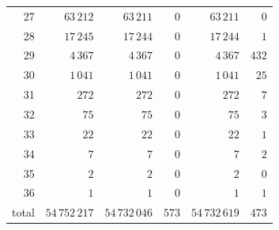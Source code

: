 \begin{tabular}{rrrrrr}
27 & $63\,212$ & $63\,211$ & $0$ & $63\,211$ & $0$\\
28 & $17\,245$ & $17\,244$ & $0$ & $17\,244$ & $1$\\
29 & $4\,367$ & $4\,367$ & $0$ & $4\,367$ & $432$\\
30 & $1\,041$ & $1\,041$ & $0$ & $1\,041$ & $25$\\
31 & $272$ & $272$ & $0$ & $272$ & $7$\\
32 & $75$ & $75$ & $0$ & $75$ & $3$\\
33 & $22$ & $22$ & $0$ & $22$ & $1$\\
34 & $7$ & $7$ & $0$ & $7$ & $2$\\
35 & $2$ & $2$ & $0$ & $2$ & $0$\\
36 & $1$ & $1$ & $0$ & $1$ & $1$\\
\midrule
total & $54\,752\,217$ & $54\,732\,046$ & $573$ & $54\,732\,619$ & $473$\\
\bottomrule
\end{tabular}
